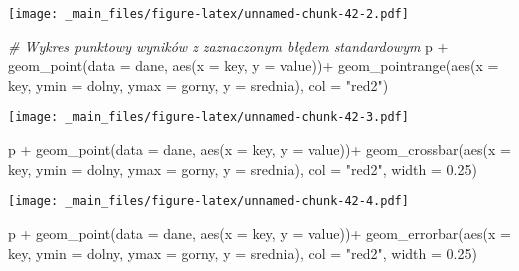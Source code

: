 \documentclass[
]{book}
\newenvironment{Shaded}{\begin{snugshade}}{\end{snugshade}}
\newcommand{\AttributeTok}[1]{\textcolor[rgb]{0.77,0.63,0.00}{#1}}
\newcommand{\CommentTok}[1]{\textcolor[rgb]{0.56,0.35,0.01}{\textit{#1}}}
\newcommand{\FloatTok}[1]{\textcolor[rgb]{0.00,0.00,0.81}{#1}}
\newcommand{\FunctionTok}[1]{\textcolor[rgb]{0.00,0.00,0.00}{#1}}
\newcommand{\NormalTok}[1]{#1}
\newcommand{\SpecialCharTok}[1]{\textcolor[rgb]{0.00,0.00,0.00}{#1}}
\newcommand{\StringTok}[1]{\textcolor[rgb]{0.31,0.60,0.02}{#1}}
\begin{document}
\texttt{[image: \_main\_files/figure-latex/unnamed-chunk-42-2.pdf]}

\begin{Shaded}
\begin{Highlighting}[]
\CommentTok{\# Wykres punktowy wyników z zaznaczonym błędem standardowym}
\NormalTok{p }\SpecialCharTok{+} \FunctionTok{geom\_point}\NormalTok{(}\AttributeTok{data =}\NormalTok{ dane, }\FunctionTok{aes}\NormalTok{(}\AttributeTok{x =}\NormalTok{ key, }\AttributeTok{y =}\NormalTok{ value))}\SpecialCharTok{+}
  \FunctionTok{geom\_pointrange}\NormalTok{(}\FunctionTok{aes}\NormalTok{(}\AttributeTok{x =}\NormalTok{ key, }\AttributeTok{ymin =}\NormalTok{ dolny, }\AttributeTok{ymax =}\NormalTok{ gorny, }\AttributeTok{y =}\NormalTok{ srednia), }\AttributeTok{col =} \StringTok{"red2"}\NormalTok{)}
\end{Highlighting}
\end{Shaded}

\texttt{[image: \_main\_files/figure-latex/unnamed-chunk-42-3.pdf]}

\begin{Shaded}
\begin{Highlighting}[]
\NormalTok{p }\SpecialCharTok{+} \FunctionTok{geom\_point}\NormalTok{(}\AttributeTok{data =}\NormalTok{ dane, }\FunctionTok{aes}\NormalTok{(}\AttributeTok{x =}\NormalTok{ key, }\AttributeTok{y =}\NormalTok{ value))}\SpecialCharTok{+}
  \FunctionTok{geom\_crossbar}\NormalTok{(}\FunctionTok{aes}\NormalTok{(}\AttributeTok{x =}\NormalTok{ key, }\AttributeTok{ymin =}\NormalTok{ dolny, }\AttributeTok{ymax =}\NormalTok{ gorny, }\AttributeTok{y =}\NormalTok{ srednia), }\AttributeTok{col =} \StringTok{"red2"}\NormalTok{, }\AttributeTok{width =} \FloatTok{0.25}\NormalTok{)}
\end{Highlighting}
\end{Shaded}

\texttt{[image: \_main\_files/figure-latex/unnamed-chunk-42-4.pdf]}

\begin{Shaded}
\begin{Highlighting}[]
\NormalTok{p }\SpecialCharTok{+} \FunctionTok{geom\_point}\NormalTok{(}\AttributeTok{data =}\NormalTok{ dane, }\FunctionTok{aes}\NormalTok{(}\AttributeTok{x =}\NormalTok{ key, }\AttributeTok{y =}\NormalTok{ value))}\SpecialCharTok{+}
  \FunctionTok{geom\_errorbar}\NormalTok{(}\FunctionTok{aes}\NormalTok{(}\AttributeTok{x =}\NormalTok{ key, }\AttributeTok{ymin =}\NormalTok{ dolny, }\AttributeTok{ymax =}\NormalTok{ gorny, }\AttributeTok{y =}\NormalTok{ srednia), }\AttributeTok{col =} \StringTok{"red2"}\NormalTok{, }\AttributeTok{width =} \FloatTok{0.25}\NormalTok{)}
\end{Highlighting}
\end{Shaded}
\end{document}

